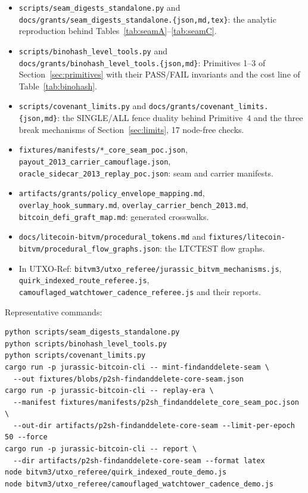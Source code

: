 \documentclass[11pt]{article}
\begin{document}
\begin{itemize}
\item \texttt{scripts/seam\_digests\_standalone.py} and
\texttt{docs/grants/seam\_digests\_standalone.\{json,md,tex\}}: the analytic
reproduction behind Tables~\ref{tab:seamA}--\ref{tab:seamC}.
\item \texttt{scripts/binohash\_level\_tools.py} and
\texttt{docs/grants/binohash\_level\_tools.\{json,md\}}: Primitives 1--3 of
Section~\ref{sec:primitives} with their PASS/FAIL invariants and the cost line
of Table~\ref{tab:binohash}.
\item \texttt{scripts/covenant\_limits.py} and
\texttt{docs/grants/covenant\_limits.\{json,md\}}: the SINGLE/ALL fence duality
behind Primitive~4 and the three break mechanisms of Section~\ref{sec:limits},
17 node-free checks.
\item \texttt{fixtures/manifests/*\_core\_seam\_poc.json},
\texttt{payout\_2013\_carrier\_camouflage.json},
\texttt{oracle\_sidecar\_2013\_replay\_poc.json}: seam and carrier manifests.
\item \texttt{artifacts/grants/policy\_envelope\_mapping.md},
\texttt{overlay\_hook\_summary.md}, \texttt{overlay\_carrier\_bench\_2013.md},
\texttt{bitcoin\_defi\_graft\_map.md}: generated crosswalks.
\item \texttt{docs/litecoin-bitvm/procedural\_tokens.md} and
\texttt{fixtures/litecoin-bitvm/procedural\_flow\_graphs.json}: the LTCTEST
flow graphs.
\item In UTXO-Ref: \texttt{bitvm3/utxo\_referee/jurassic\_bitvm\_mechanisms.js},
\texttt{quirk\_indexed\_route\_referee.js},
\texttt{camouflaged\_watchtower\_cadence\_referee.js} and their reports.
\end{itemize}

Representative commands:

\begin{verbatim}
python scripts/seam_digests_standalone.py
python scripts/binohash_level_tools.py
python scripts/covenant_limits.py
cargo run -p jurassic-bitcoin-cli -- mint-findanddelete-seam \
  --out fixtures/blobs/p2sh-findanddelete-core-seam.json
cargo run -p jurassic-bitcoin-cli -- replay-era \
  --manifest fixtures/manifests/p2sh_findanddelete_core_seam_poc.json \
  --out-dir artifacts/p2sh-findanddelete-core-seam --limit-per-epoch 50 --force
cargo run -p jurassic-bitcoin-cli -- report \
  --dir artifacts/p2sh-findanddelete-core-seam --format latex
node bitvm3/utxo_referee/quirk_indexed_route_demo.js
node bitvm3/utxo_referee/camouflaged_watchtower_cadence_demo.js
\end{verbatim}
\end{document}
